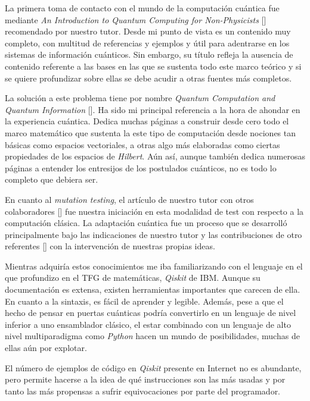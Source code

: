 La primera toma de contacto con el mundo de la computación cuántica fue mediante \textit{An Introduction to Quantum Computing for Non-Physicists} [\cite{rieffel2000introduction}] recomendado por nuestro tutor. Desde mi punto de vista es un contenido muy completo, con multitud de referencias y ejemplos y útil para adentrarse en los sistemas de información cuánticos. Sin embargo, su título refleja la ausencia de contenido referente a las bases en las que se sustenta todo este marco teórico y si se quiere profundizar sobre ellas se debe acudir a otras fuentes más completos.

La solución a este problema tiene por nombre \textit{Quantum Computation and Quantum Information} [\cite{nielsen2001quantum}]. Ha sido mi principal referencia a la hora de ahondar en la experiencia cuántica. Dedica muchas páginas a construir desde cero todo el marco matemático que sustenta la este tipo de computación desde nociones tan básicas como espacios vectoriales, a otras algo más elaboradas como ciertas propiedades de los espacios de \textit{Hilbert}. Aún así, aunque también dedica numerosas páginas a entender los entresijos de los postulados cuánticos, no es todo lo completo que debiera ser.

En cuanto al \textit{mutation testing}, el artículo de nuestro tutor con otros colaboradores [\cite{hierons2010mutation}] fue nuestra iniciación en esta modalidad de test con respecto a la computación clásica. La adaptación cuántica fue un proceso que se desarrolló principalmente bajo las indicaciones de nuestro tutor y las contribuciones de otro referentes [\cite{usaolaquantum}] con la intervención de nuestras propias ideas.

Mientras adquiría estos conocimientos me iba familiarizando con el lenguaje en el que profundizo en el TFG de matemáticas, \textit{Qiskit} de IBM. Aunque su documentación es extensa, existen herramientas importantes que carecen de ella. En cuanto a la sintaxis, es fácil de aprender y legible. Además, pese a que el hecho de pensar en puertas cuánticas podría convertirlo en un lenguaje de nivel inferior a uno ensamblador clásico, el estar combinado con un lenguaje de alto nivel multiparadigma como \textit{Python} hacen un mundo de posibilidades, muchas de ellas aún por explotar.

El número de ejemplos de código en \textit{Qiskit} presente en Internet no es abundante, pero permite hacerse a la idea de qué instrucciones son las más usadas y por tanto las más propensas a sufrir equivocaciones por parte del programador.

